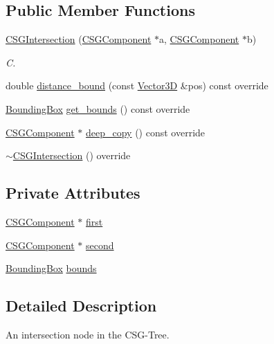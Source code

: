 \subsection*{Public Member Functions}
\begin{DoxyCompactItemize}
\item 
\mbox{\hyperlink{classCSGIntersection_a0d74ea7a39a6fbfe3e6f3f918b01f63d}{C\+S\+G\+Intersection}} (\mbox{\hyperlink{classCSGComponent}{C\+S\+G\+Component}} $\ast$a, \mbox{\hyperlink{classCSGComponent}{C\+S\+G\+Component}} $\ast$b)
\begin{DoxyCompactList}\small\item\em C. \end{DoxyCompactList}\item 
double \mbox{\hyperlink{classCSGIntersection_a199cc8192cdaeacae17d5b3c6dfef6a1}{distance\+\_\+bound}} (const \mbox{\hyperlink{classVector3D}{Vector3D}} \&pos) const override
\item 
\mbox{\hyperlink{classBoundingBox}{Bounding\+Box}} \mbox{\hyperlink{classCSGIntersection_ad1f53a70c93dcdb6f8725a491fa24917}{get\+\_\+bounds}} () const override
\item 
\mbox{\hyperlink{classCSGComponent}{C\+S\+G\+Component}} $\ast$ \mbox{\hyperlink{classCSGIntersection_a4721227de85e675484ab206c299c5867}{deep\+\_\+copy}} () const override
\item 
\mbox{\hyperlink{classCSGIntersection_a0407d092eed23f2e6493e848482e130e}{$\sim$\+C\+S\+G\+Intersection}} () override
\end{DoxyCompactItemize}
\subsection*{Private Attributes}
\begin{DoxyCompactItemize}
\item 
\mbox{\hyperlink{classCSGComponent}{C\+S\+G\+Component}} $\ast$ \mbox{\hyperlink{classCSGIntersection_af9619c91599eb3f81342000284e0f1c6}{first}}
\item 
\mbox{\hyperlink{classCSGComponent}{C\+S\+G\+Component}} $\ast$ \mbox{\hyperlink{classCSGIntersection_a71b90fe1c487c4cc5fce0614f503e29c}{second}}
\item 
\mbox{\hyperlink{classBoundingBox}{Bounding\+Box}} \mbox{\hyperlink{classCSGIntersection_a25fb136c5dcda3e15357b6c1abb1c2e2}{bounds}}
\end{DoxyCompactItemize}


\subsection{Detailed Description}
An intersection node in the C\+S\+G-\/\+Tree. 

